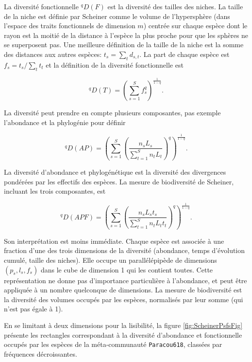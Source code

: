 \documentclass[
  11pt,
  french,
  a4paper,
  extrafontsizes,onecolumn,openright
  ]{memoir}
\begin{document}
La diversité fonctionnelle \(^{q}\!D(F)\) est la diversité des tailles des niches. La taille de la niche est définie par Scheiner comme le volume de l'hypersphère (dans l'espace des traits fonctionnels de dimension \(m\)) centrée sur chaque espèce dont le rayon est la moitié de la distance à l'espèce la plus proche pour que les sphères ne se superposent pas.
Une meilleure définition \autocite{Presley2014} de la taille de la niche est la somme des distances aux autres espèces: \(t_s = \sum_t{d_{s,t}}\). La part de chaque espèce est \(f_s={t_s}/{\sum_t{t_t}}\) et la définition de la diversité fonctionnelle est

\begin{equation}
  \label{eq:DqT}
  ^{q}\!D(T) = {\left(\sum^S_{s=1}{f_s^q}\right)}^{\frac{1}{1-q}}.
\end{equation}

La diversité peut prendre en compte plusieurs composantes, pas exemple l'abondance et la phylogénie pour définir

\begin{equation}
  \label{eq:qDAP}
  ^{q}\!D(AP) = {\left(\sum^S_{s=1}{\left(\frac{n_s L_s}{\sum^S_{t=1}{n_t L_t}}\right)^q}\right)}^{\frac{1}{1-q}}.
\end{equation}

La diversité d'abondance et phylogénétique est la diversité des divergences pondérées par les effectifs des espèces.
La mesure de biodiversité de Scheiner, incluant les trois composantes, est

\begin{equation}
  \label{eq:qDAF}
  ^{q}\!D(APF) = {\left(\sum^S_{s=1}{\left(\frac{n_s L_s t_s}{\sum^S_{t=1}{n_t L_t t_t}}\right)^q}\right)}^{\frac{1}{1-q}}.
\end{equation}

Son interprétation est moins immédiate.
Chaque espèce est associée à une fraction d'une des trois dimensions de la diversité (abondance, temps d'évolution cumulé, taille des niches).
Elle occupe un parallélépipède de dimensions \((p_s, l_s, f_s)\) dans le cube de dimension 1 qui les contient toutes.
Cette représentation ne donne pas d'importance particulière à l'abondance, et peut être appliquée à un nombre quelconque de dimensions.
La mesure de biodiversité est la diversité des volumes occupés par les espèces, normalisés par leur somme (qui n'est pas égale à 1).

En se limitant à deux dimensions pour la lisibilité, la figure \ref{fig:ScheinerPsfsFig} présente les rectangles correspondant à la diversité d'abondance et fonctionnelle occupés par les espèces de la méta-communauté \texttt{Paracou618}, classées par fréquences décroissantes.
\end{document}
